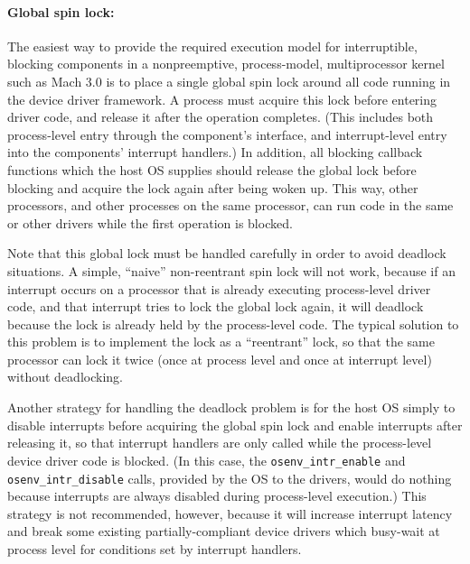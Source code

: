 
\paragraph{Global spin lock:}
The easiest way to provide the required execution model
for interruptible, blocking components
in a nonpreemptive, process-model, multiprocessor kernel such as Mach 3.0
is to place a single global spin lock
around all code running in the device driver framework.
A process must acquire this lock before entering driver code,
and release it after the operation completes.
(This includes both process-level entry through the component's interface,
and interrupt-level entry into the components' interrupt handlers.)
In addition, all blocking callback functions
which the host OS supplies
should release the global lock before blocking
and acquire the lock again after being woken up.
This way, other processors, and other processes on the same processor,
can run code in the same or other drivers while the first operation is blocked.

Note that this global lock must be handled carefully
in order to avoid deadlock situations.
A simple, ``naive'' non-reentrant spin lock will not work,
because if an interrupt occurs on a processor
that is already executing process-level driver code,
and that interrupt tries to lock the global lock again,
it will deadlock because the lock is already held by the process-level code.
The typical solution to this problem
is to implement the lock as a ``reentrant'' lock,
so that the same processor can lock it twice
(once at process level and once at interrupt level)
without deadlocking.

Another strategy for handling the deadlock problem
is for the host OS simply to
disable interrupts before acquiring the global spin lock
and enable interrupts after releasing it,
so that interrupt handlers are only called
while the process-level device driver code is blocked.
(In this case, the {\tt osenv_intr_enable} and {\tt osenv_intr_disable} calls,
provided by the OS to the drivers,
would do nothing because interrupts are always disabled
during process-level execution.)
This strategy is not recommended, however,
because it will increase interrupt latency
and break some existing partially-compliant device drivers
which busy-wait at process level for conditions set by interrupt handlers.

